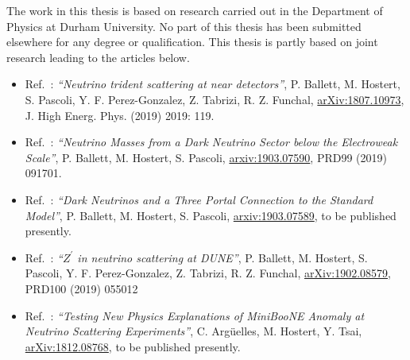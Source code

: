 \documentclass[openany,twoside,frontopenright,openright]{ip3thesis}
\begin{document}
\begin{declaration*}
%
	The work in this thesis is based on research carried out in the Department of
	Physics at Durham University. No part of this thesis has been
	submitted elsewhere for any degree or qualification. This thesis is partly based on joint research leading to the articles below.
	\begin{itemize}
	 \item Ref.~\cite{Ballett:2018uuc}: \textit{``Neutrino trident scattering at near detectors''}, P. Ballett, M. Hostert, S. Pascoli, Y. F. Perez-Gonzalez, Z. Tabrizi, R. Z. Funchal, \href{https://arxiv.org/abs/1807.10973}{arXiv:1807.10973}, J. High Energ. Phys. (2019) 2019: 119.
	 \item Ref.~\cite{Ballett:2019cqp}: \textit{``Neutrino Masses from a Dark Neutrino Sector below the Electroweak Scale''}, P. Ballett, M. Hostert, S. Pascoli, \href{https://arxiv.org/abs/1903.07590}{arxiv:1903.07590}, PRD99 (2019) 091701.
	\end{itemize}
	\begin{itemize}
	\item Ref.~\cite{Ballett:2019pyw}: \textit{``Dark Neutrinos and a Three Portal Connection to the Standard Model''}, P. Ballett, M. Hostert, S. Pascoli, \href{https://arxiv.org/abs/1903.07589}{arxiv:1903.07589}, to be published presently.
	\item Ref.~\cite{Ballett:2019xoj}: \textit{``$Z^\prime$ in neutrino scattering at DUNE''}, P. Ballett, M. Hostert, S. Pascoli, Y. F. Perez-Gonzalez, Z. Tabrizi, R. Z. Funchal, \href{https://arxiv.org/abs/1902.08579}{arXiv:1902.08579}, PRD100 (2019) 055012
 	\end{itemize}
	\begin{itemize}
	\item Ref.~\cite{Arguelles:2018mtc}: \textit{``Testing New Physics Explanations of MiniBooNE Anomaly at Neutrino Scattering Experiments''}, C. Arg\"uelles, M. Hostert, Y. Tsai, \href{https://arxiv.org/abs/1812.08768}{arXiv:1812.08768}, to be published presently.
	\end{itemize}
\end{declaration*}
\end{document}
